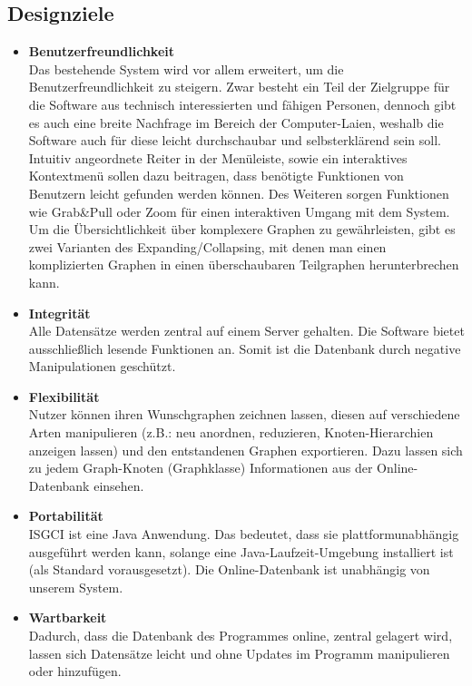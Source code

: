 \documentclass[10pt,a4paper]{article}
\begin{document}
\subsection{Designziele}
\begin{itemize}	
		\item \textbf{Benutzerfreundlichkeit}\\
		Das bestehende System wird vor allem erweitert, um die Benutzerfreundlichkeit zu steigern. Zwar besteht ein Teil der Zielgruppe für die Software aus technisch interessierten und fähigen Personen, dennoch gibt es auch eine breite Nachfrage im Bereich der Computer-Laien, weshalb die Software auch für diese leicht durchschaubar und selbsterklärend sein soll. Intuitiv angeordnete Reiter in der Menüleiste, sowie ein interaktives Kontextmenü sollen dazu beitragen, dass benötigte Funktionen von Benutzern leicht gefunden werden können. Des Weiteren sorgen Funktionen wie Grab\&Pull oder Zoom für einen interaktiven Umgang mit dem System. Um die Übersichtlichkeit über komplexere Graphen zu gewährleisten, gibt es zwei Varianten des Expanding/Collapsing, mit denen man einen komplizierten Graphen in einen überschaubaren Teilgraphen herunterbrechen kann.
		\item \textbf{Integrität}\\
		Alle Datensätze werden zentral auf einem Server gehalten. Die Software bietet ausschließlich lesende Funktionen an. Somit ist die Datenbank durch negative Manipulationen geschützt.
		\item \textbf{Flexibilität}\\
		Nutzer können ihren Wunschgraphen zeichnen lassen, diesen auf verschiedene Arten manipulieren (z.B.: neu anordnen, reduzieren, Knoten-Hierarchien anzeigen lassen) und den entstandenen Graphen exportieren. Dazu lassen sich zu jedem Graph-Knoten (Graphklasse) Informationen aus der Online-Datenbank einsehen.  
		\item \textbf{Portabilität}\\
		ISGCI ist eine Java Anwendung. Das bedeutet, dass sie plattformunabhängig ausgeführt werden kann, solange eine Java-Laufzeit-Umgebung installiert ist (als Standard vorausgesetzt).
		Die Online-Datenbank ist unabhängig von unserem System. 
		\item \textbf{Wartbarkeit}\\
		Dadurch, dass die Datenbank des Programmes online, zentral gelagert wird, lassen sich Datensätze leicht und ohne Updates im Programm manipulieren oder hinzufügen.
		\end{itemize}
\end{document}
